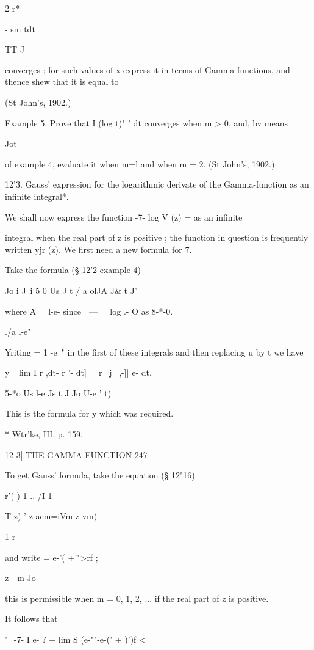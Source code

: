 2 r* 

 - sin tdt 

TT J 

converges ; for such values of x express it in terms of Gamma-functions, and thence shew 
that it is equal to 

(St John's, 1902.) 

Example 5. Prove that I (log t)"  '  dt converges when m > 0, and, bv means 

Jot 

of example 4, evaluate it when m=l and when m = 2. (St John's, 1902.) 



12'3. Gauss' expression for the logarithmic derivate of the Gamma-function 
as an infinite integral*. 

We shall now express the function -7- log V (z) = as an infinite 

integral when the real part of z is positive ; the function in question is 
frequently written yjr (z). We first need a new formula for 7. 

Take the formula (§ 12'2 example 4) 

  Jo i J\ i 5 0 Us   J  t / a olJA  J\& t J' 

where A = l-e-  since | — = log  .- O as 8-*-0. 

./a   l-e"  

 Yriting   = 1 -e~" in the first of these integrals and then replacing u by t we have 

y= lim I r  ,dt- r '- dt] = r \ j~ ,-]] e- dt. 

5-*o Us l-e Js t J Jo U-e ' t) 

This is the formula for y which was required. 

* Wtr'ke, HI, p. 159. 



12-3] THE GAMMA FUNCTION 247 

To get Gauss' formula, take the equation (§ 12"16) 

r'( ) 1 ..   /I 1 \ 

T z) ' z   acm=iVm z-vm) 

1 r 

and write = e-'( +'">rf ; 

z -  m Jo 

this is permissible when m = 0, 1, 2, ... if the real part of z is positive. 

It follows that 

 '=-7- I e- ? + lim S (e-""-e-(' + )')f < 

